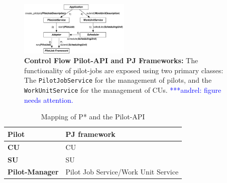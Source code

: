 \documentclass[conference,final]{IEEEtran}
\newcommand{\alnote}[1]{ {\textcolor{blue} { ***andrel: #1 }}}
\newcommand{\alnote}[1]{}
\newcommand{\cu}{CU\xspace}
\newcommand{\cus}{CUs\xspace}
\newcommand{\upp}{\vspace*{-0.5em}}
\begin{document}


\begin{figure}[t]
	\centering
		\includegraphics[width=0.47\textwidth]{figures/troy_flow.pdf}
	\caption{\textbf{Control Flow Pilot-API and PJ Frameworks:} The functionality    of pilot-jobs are exposed 
	using two primary classes: The \texttt{PilotJobService} for the management 
	of pilots, and the \texttt{WorkUnitService} for the management of \cus.
    \alnote{figure needs attention.}
	}
	\label{fig:figures_troy_flow}
\end{figure}

\begin{table}[t]
	\centering
\begin{tabular}{|l|l|}
\hline
\textbf{Pilot} &PJ framework\\
\hline
\textbf{\cu } &\cu \\
\hline
\textbf{SU} &SU\\
\hline
\textbf{Pilot-Manager} & Pilot Job Service/Work Unit Service\\
\hline
\end{tabular}
\caption{Mapping of P* and the Pilot-API\upp\upp}\label{table:pstar_elements}
\end{table}
\end{document}
